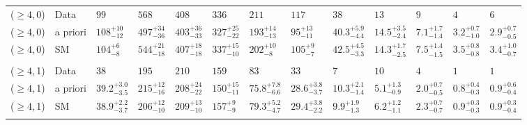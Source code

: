 \begin{table}[!t]
{\begin{tabular}{ lllllllllllll }
    ($\geq4$,\,0)
             & Data
             & $99$
             & $568$
             & $408$
             & $336$
             & $211$
             & $117$
             & $38$
             & $13$
             & $9$
             & $4$
             & $6$                                      \\
    ($\geq4$,\,0)
             & a priori
             & $108^{+10}_{-12}$
             & $497^{+34}_{-36}$
             & $403^{+36}_{-33}$
             & $327^{+25}_{-22}$
             & $193^{+14}_{-13}$
             & $95^{+13}_{-11}$
             & $40.3^{+5.9}_{-4.4}$
             & $14.5^{+3.5}_{-2.4}$
             & $7.1^{+1.7}_{-1.4}$
             & $3.2^{+0.7}_{-1.0}$
             & $2.9^{+0.7}_{-0.5}$                      \\
    ($\geq4$,\,0)
             & SM
             & $104^{+6}_{-8}$
             & $544^{+21}_{-18}$
             & $407^{+18}_{-18}$
             & $337^{+15}_{-10}$
             & $202^{+10}_{-8}$
             & $105^{+9}_{-7}$
             & $42.5^{+4.5}_{-3.3}$
             & $14.3^{+1.7}_{-2.5}$
             & $7.5^{+1.4}_{-1.5}$
             & $3.5^{+0.8}_{-0.8}$
             & $3.4^{+1.0}_{-0.7}$                      \\\\[-2ex]
    ($\geq4$,\,1)
             & Data
             & $38$
             & $195$
             & $210$
             & $159$
             & $83$
             & $33$
             & $7$
             & $10$
             & $4$
             & $1$
             & $1$                                      \\
    ($\geq4$,\,1)
             & a priori
             & $39.2^{+3.0}_{-3.5}$
             & $215^{+12}_{-16}$
             & $208^{+24}_{-22}$
             & $150^{+15}_{-11}$
             & $75.8^{+7.8}_{-6.6}$
             & $28.6^{+3.8}_{-3.7}$
             & $10.3^{+2.1}_{-1.4}$
             & $5.1^{+1.3}_{-0.9}$
             & $2.0^{+0.7}_{-0.5}$
             & $0.8^{+0.4}_{-0.3}$
             & $0.9^{+0.6}_{-0.4}$                      \\
    ($\geq4$,\,1)
             & SM
             & $38.9^{+2.2}_{-3.7}$
             & $206^{+12}_{-10}$
             & $209^{+13}_{-10}$
             & $157^{+9}_{-9}$
             & $79.3^{+5.2}_{-4.7}$
             & $29.4^{+3.8}_{-2.2}$
             & $9.9^{+1.9}_{-1.3}$
             & $6.2^{+1.2}_{-1.1}$
             & $2.3^{+0.7}_{-0.7}$
             & $0.9^{+0.3}_{-0.3}$
             & $0.9^{+0.3}_{-0.4}$                      \\\\[-2ex]

\end{tabular}}
\end{table}
